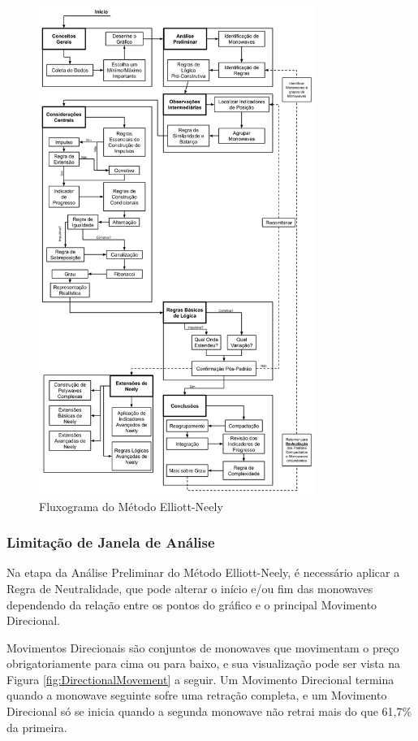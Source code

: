 \documentclass[12pt]{article}
\begin{document}
\begin{figure}[H]
	\centering
	\includegraphics[width=0.8\textwidth]{Elliott-NeelyMethod.png}
	\caption{Fluxograma do Método Elliott-Neely}\label{fig:Elliott-NeelyMethod}
\end{figure}

\subsubsection{Limitação de Janela de Análise}

Na etapa da Análise Preliminar do Método Elliott-Neely, é necessário aplicar a Regra
de Neutralidade, que pode alterar o início e/ou fim das monowaves dependendo da relação entre
os pontos do gráfico e o principal Movimento Direcional.

Movimentos Direcionais são conjuntos de monowaves que movimentam o preço obrigatoriamente
para cima ou para baixo, e sua visualização pode ser vista na Figura
\ref{fig:DirectionalMovement} a seguir. Um Movimento Direcional termina quando a monowave
seguinte sofre uma retração completa, e um Movimento Direcional só se inicia quando a segunda
monowave não retrai mais do que 61,7\% da primeira.
\end{document}
